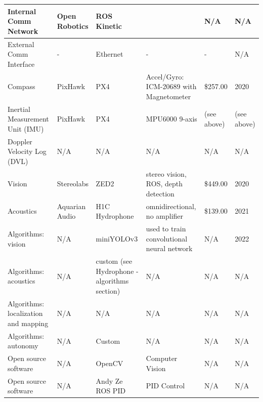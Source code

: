 \documentclass[conference]{IEEEtran}
\begin{document}
\begin{table}[htbp]
\begin{center}
\begin{tabularx}{\textwidth}{|X|X|X|X|X|X|}
        Internal Comm Network & Open Robotics & ROS Kinetic & ~ & N/A & N/A \\ \hline
        External Comm Interface & - & Ethernet & - & - & N/A \\ \hline
        Compass  & PixHawk & PX4 & Accel/Gyro: ICM-20689 with Magnetometer & \$257.00  & 2020 \\ \hline
        Inertial Measurement Unit (IMU)  & PixHawk & PX4 & MPU6000 9-axis & (see above) & (see above) \\ \hline
        Doppler Velocity Log (DVL) & N/A & N/A & N/A & N/A & N/A \\ \hline
        Vision & Stereolabs & ZED2 & stereo vision, ROS, depth detection & \$449.00  & 2020 \\ \hline
        Acoustics & Aquarian Audio & H1C Hydrophone & omnidirectional, no amplifier & \$139.00  & 2021 \\ \hline
        Algorithms: vision  & N/A & miniYOLOv3 & used to train convolutional neural network & N/A & 2022 \\ \hline
        Algorithms: acoustics  & N/A & custom (see Hydrophone - algorithms section) & N/A & N/A & N/A \\ \hline
        Algorithms: localization and mapping  & N/A & N/A & N/A & N/A & N/A \\ \hline
        Algorithms: autonomy  & N/A & Custom & N/A & N/A & N/A \\ \hline
        Open source software & N/A & OpenCV & Computer Vision & N/A & N/A \\ \hline
        Open source software & N/A & Andy Ze ROS PID & PID Control & N/A & N/A \\ \hline
    \end{tabularx}
\label{tab1}
\end{center}
\end{table}
\end{document}
